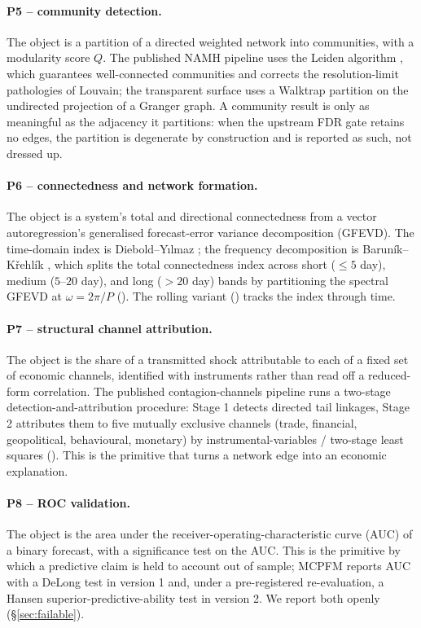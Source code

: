 \paragraph{P5 -- community detection.}
The object is a partition of a directed weighted network into communities, with a
modularity score $Q$. The published NAMH pipeline uses the Leiden algorithm
\citep{traag2019}, which guarantees well-connected communities and corrects the
resolution-limit pathologies of Louvain; the transparent  surface uses
a Walktrap partition on the undirected projection of a Granger graph. A community
result is only as meaningful as the adjacency it partitions: when the upstream FDR
gate retains no edges, the partition is degenerate by construction and is reported as
such, not dressed up.

\paragraph{P6 -- connectedness and network formation.}
The object is a system's total and directional connectedness from a vector
autoregression's generalised forecast-error variance decomposition (GFEVD). The
time-domain index is Diebold--Y{\i}lmaz \citep{diebold2012,diebold2014}; the
frequency decomposition is Barun{\'i}k--K{\v r}ehl{\'i}k \citep{barunik2018}, which
splits the total connectedness index across short ($\le 5$ day), medium ($5$--$20$
day), and long ($>20$ day) bands by partitioning the spectral GFEVD at
$\omega=2\pi/P$ (). The rolling variant
() tracks the index through time.

\paragraph{P7 -- structural channel attribution.}
The object is the share of a transmitted shock attributable to each of a fixed set of
economic channels, identified with instruments rather than read off a reduced-form
correlation. The published contagion-channels pipeline
\citep{bhandari2026contagion,ccpkg} runs a two-stage detection-and-attribution
procedure: Stage 1 detects directed tail linkages, Stage 2 attributes them to five
mutually exclusive channels (trade, financial, geopolitical, behavioural, monetary)
by instrumental-variables / two-stage least squares ().
This is the primitive that turns a network edge into an economic explanation.

\paragraph{P8 -- ROC validation.}
The object is the area under the receiver-operating-characteristic curve (AUC) of a
binary forecast, with a significance test on the AUC. This is the primitive by which a
predictive claim is held to account out of sample; MCPFM \citep{bhandari2025mcpfm}
reports AUC with a DeLong test in version 1 and, under a pre-registered
re-evaluation, a Hansen superior-predictive-ability test in version 2. We report both
openly (\S\ref{sec:failable}).

